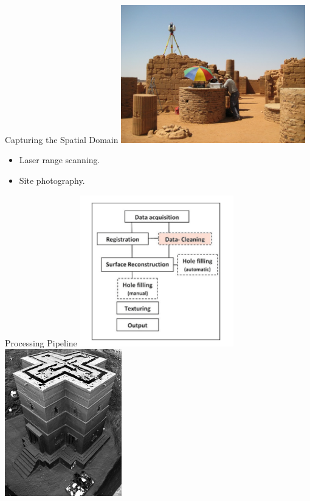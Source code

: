 \documentclass{beamer}
\begin{document}
\begin{frame}{Capturing the Spatial Domain}
  \includegraphics[width=0.60\textwidth]{pics/scanning.jpg}
    \begin{itemize}
  \item
    Laser range scanning.
  \item
    Site photography.
  \end{itemize}
\end{frame}

\begin{frame}{Processing Pipeline}
  \includegraphics[width=0.50\textwidth]{pics/pipeline.png}
  \includegraphics[width=0.38\textwidth]{pics/zamani2.jpg}
\end{frame}
\end{document}
